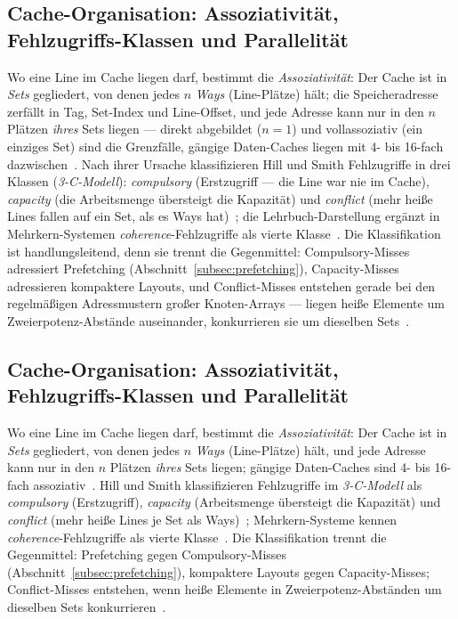 \begin{nurlang}
\subsection{Cache-Organisation: Assoziativität, Fehlzugriffs-Klassen und Parallelität}\label{subsec:cache-organisation}
Wo eine Line im Cache liegen darf, bestimmt die \emph{Assoziativität}: Der Cache ist in \emph{Sets}
gegliedert, von denen jedes $n$ \emph{Ways} (Line-Plätze) hält; die Speicheradresse zerfällt in Tag,
Set-Index und Line-Offset, und jede Adresse kann nur in den $n$ Plätzen \emph{ihres} Sets liegen ---
direkt abgebildet ($n=1$) und vollassoziativ (ein einziges Set) sind die Grenzfälle, gängige
Daten-Caches liegen mit 4- bis 16-fach
dazwischen~\cite{hennessy2019architecture,intel_optimization,amd_sog}. Nach ihrer Ursache
klassifizieren Hill und Smith Fehlzugriffe in drei Klassen (\emph{3-C-Modell}): \emph{compulsory}
(Erstzugriff --- die Line war nie im Cache), \emph{capacity} (die Arbeitsmenge übersteigt die
Kapazität) und \emph{conflict} (mehr heiße Lines fallen auf ein Set, als es Ways
hat)~\cite{hill1989associativity}; die Lehrbuch-Darstellung ergänzt in Mehrkern-Systemen
\emph{coherence}-Fehlzugriffe als vierte Klasse~\cite{hennessy2019architecture}. Die Klassifikation
ist handlungsleitend, denn sie trennt die Gegenmittel: Compulsory-Misses adressiert Prefetching
(Abschnitt~\ref{subsec:prefetching}), Capacity-Misses adressieren kompaktere Layouts, und
Conflict-Misses entstehen gerade bei den regelmäßigen Adressmustern großer Knoten-Arrays --- liegen
heiße Elemente um Zweierpotenz-Abstände auseinander, konkurrieren sie um dieselben
Sets~\cite{hennessy2019architecture,drepper2007memory}.
\end{nurlang}
\begin{nurkurz}
\subsection{Cache-Organisation: Assoziativität, Fehlzugriffs-Klassen und Parallelität}\label{subsec:cache-organisation}
Wo eine Line im Cache liegen darf, bestimmt die \emph{Assoziativität}: Der Cache ist in \emph{Sets} gegliedert, von
denen jedes $n$ \emph{Ways} (Line-Plätze) hält, und jede Adresse kann nur in den $n$ Plätzen \emph{ihres} Sets
liegen; gängige Daten-Caches sind 4- bis 16-fach assoziativ~\cite{hennessy2019architecture,intel_optimization,amd_sog}.
Hill und Smith klassifizieren Fehlzugriffe im \emph{3-C-Modell} als \emph{compulsory} (Erstzugriff),
\emph{capacity} (Arbeitsmenge übersteigt die Kapazität) und \emph{conflict} (mehr heiße Lines je Set als
Ways)~\cite{hill1989associativity}; Mehrkern-Systeme kennen \emph{coherence}-Fehlzugriffe als vierte
Klasse~\cite{hennessy2019architecture}. Die Klassifikation trennt die Gegenmittel: Prefetching gegen Compulsory-Misses
(Abschnitt~\ref{subsec:prefetching}), kompaktere Layouts gegen Capacity-Misses; Conflict-Misses entstehen, wenn heiße
Elemente in Zweierpotenz-Abständen um dieselben Sets konkurrieren~\cite{hennessy2019architecture,drepper2007memory}.
\end{nurkurz}


